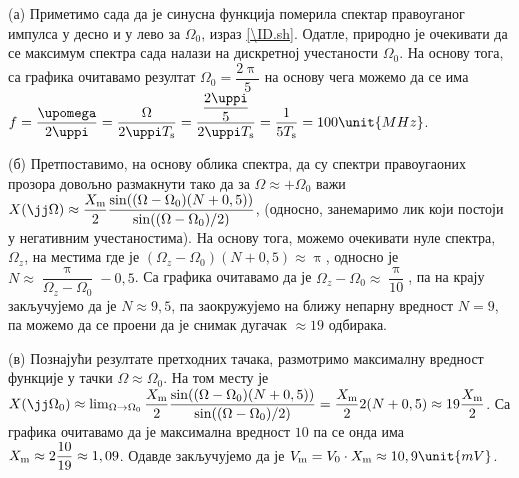 (а) Приметимо сада да је синусна функција померила спектар правоуганог импулса у десно и у лево за 
$\Omega_0$, израз \eqref{\ID.sh}. Одатле, природно је очекивати да се максимум спектра сада налази на дискретној учестаности 
$\Omega_0$. На основу тога, са графика очитавамо резултат $\Omega_0 = \dfrac{2\uppi}{5}$ на основу чега можемо да 
се има $f = \dfrac{\upomega}{2\uppi} = \dfrac{\Omega}{2\uppi T_{\rm s}} = \dfrac{ \dfrac{2\uppi}{5} }{2 \uppi T_{\rm s}}
= \dfrac{1}{5 T_{\rm s}} = 100 \unit{MHz}$. 

(б) Претпоставимо, на основу облика спектра, да су спектри правоугаоних прозора довољно размакнути тако да 
за  $\Omega \approx +\Omega_0$ важи $X(\jj\Omega) \approx \dfrac{X_{\rm m}}{2} \dfrac{\sin( (\Omega - \Omega_0)(N + 0,5) ) }{ \sin((\Omega - \Omega_0)/2) }$, 
(односно, занемаримо лик који постоји у негативним учестаностима). На основу тога, можемо очекивати нуле спектра, 
$\Omega_z$,  
на местима где је $(\Omega_z - \Omega_0)(N + 0,5) \approx \uppi$, односно је 
$ N \approx \dfrac{\uppi}{\Omega_z - \Omega_0} - 0,5$. Са графика очитавамо да је 
${\Omega_z - \Omega_0} \approx \dfrac{\uppi}{10}$, па на крају закључујемо да је $N \approx 9,5$, па заокружујемо на 
ближу непарну вредност $N = 9$, па можемо да се проени да је снимак дугачак $\approx 19$ одбирака. 

(в) Познајући резултате претходних тачака, размотримо максималну вредност функције у тачки $\Omega \approx \Omega_0$. 
На том месту је 
$X(\jj\Omega_0) \approx \lim_{\Omega \to \Omega_0} \dfrac{X_{\rm m}}{2} \dfrac{\sin( (\Omega - \Omega_0)(N + 0,5) ) }{ \sin((\Omega - \Omega_0)/2) }
= \dfrac{X_{\rm m}}{2} 2(N + 0,5) \approx 19 \dfrac{X_{\rm m}}{2}$. Са графика очитавамо да је максимална вредност $10$ па се онда има 
$X_{\rm m} \approx 2 \dfrac{10}{19} \approx 1,09$. Одавде закључујемо да је $V_{\rm m} = V_0 \cdot X_{\rm m} 
\approx 10,9\unit{mV}$. 
